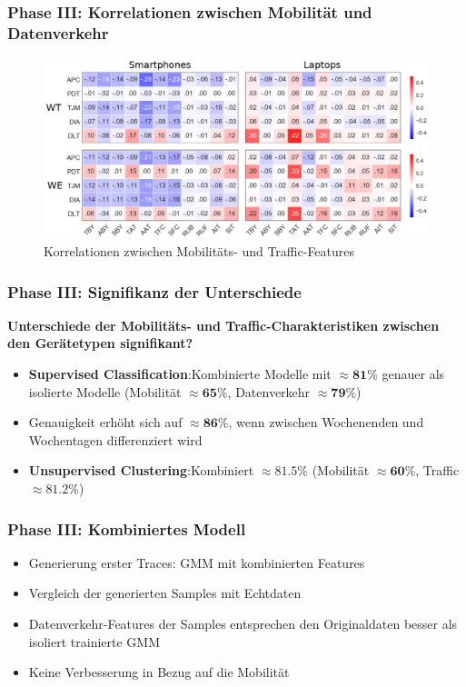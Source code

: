 \documentclass{beamer}
\begin{document}
\begin{frame}
  \frametitle{Phase III: Korrelationen zwischen Mobilität und Datenverkehr}
  \begin{figure}
    \centering
    \includegraphics[width=\textwidth]{images/correlations.png}
    \caption*{Korrelationen zwischen Mobilitäts- und Traffic-Features}
  \end{figure}
\end{frame}

\begin{frame}
  \frametitle{Phase III: Signifikanz der Unterschiede}
  \textbf{Unterschiede der Mobilitäts- und Traffic-Charakteristiken zwischen den Gerätetypen signifikant?}\newline
  \begin{itemize}
    \item \textbf{Supervised Classification}:\newline Kombinierte Modelle mit $\approx \boldsymbol{81\%}$ genauer als isolierte Modelle (Mobilität $\approx \boldsymbol{65 \%}$, Datenverkehr $\approx \boldsymbol{79 \%}$)
    \item Genauigkeit erhöht sich auf $\approx \boldsymbol{86\%}$, wenn zwischen Wochenenden und Wochentagen differenziert wird    
    \item \textbf{Unsupervised Clustering}:\newline Kombiniert $\approx\boldsymbol{81.5 \%}$ (Mobilität $\approx \boldsymbol{60 \%}$, Traffic $\approx \boldsymbol{81.2 \%}$)
  \end{itemize}
\end{frame}

\begin{frame}
  \frametitle{Phase III: Kombiniertes Modell}
  \begin{itemize}
    \item Generierung erster Traces: GMM mit kombinierten Features
    \item Vergleich der generierten Samples mit Echtdaten
    \item Datenverkehr-Features der Samples entsprechen den Originaldaten besser als isoliert trainierte GMM
    \item Keine Verbesserung in Bezug auf die Mobilität
  \end{itemize}
\end{frame}
\end{document}
